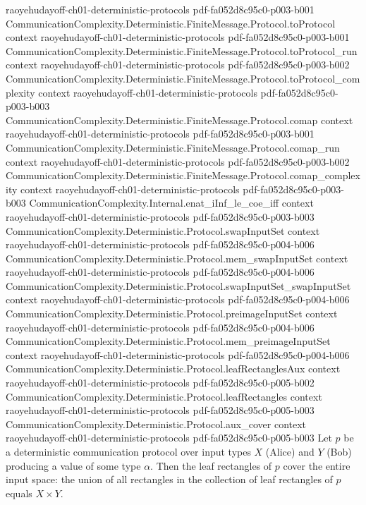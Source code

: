 \begin{lemma}
  {raoyehudayoff-ch01-deterministic-protocols}
  {pdf-fa052d8c95c0-p003-b001}
\proofstep
  {CommunicationComplexity.Deterministic.FiniteMessage.Protocol.toProtocol}
  {context}
  {raoyehudayoff-ch01-deterministic-protocols}
  {pdf-fa052d8c95c0-p003-b001}
\proofstep
  {CommunicationComplexity.Deterministic.FiniteMessage.Protocol.toProtocol_run}
  {context}
  {raoyehudayoff-ch01-deterministic-protocols}
  {pdf-fa052d8c95c0-p003-b002}
\proofstep
  {CommunicationComplexity.Deterministic.FiniteMessage.Protocol.toProtocol_complexity}
  {context}
  {raoyehudayoff-ch01-deterministic-protocols}
  {pdf-fa052d8c95c0-p003-b003}
\proofstep
  {CommunicationComplexity.Deterministic.FiniteMessage.Protocol.comap}
  {context}
  {raoyehudayoff-ch01-deterministic-protocols}
  {pdf-fa052d8c95c0-p003-b001}
\proofstep
  {CommunicationComplexity.Deterministic.FiniteMessage.Protocol.comap_run}
  {context}
  {raoyehudayoff-ch01-deterministic-protocols}
  {pdf-fa052d8c95c0-p003-b002}
\proofstep
  {CommunicationComplexity.Deterministic.FiniteMessage.Protocol.comap_complexity}
  {context}
  {raoyehudayoff-ch01-deterministic-protocols}
  {pdf-fa052d8c95c0-p003-b003}
\proofstep
  {CommunicationComplexity.Internal.enat_iInf_le_coe_iff}
  {context}
  {raoyehudayoff-ch01-deterministic-protocols}
  {pdf-fa052d8c95c0-p003-b003}
\proofstep
  {CommunicationComplexity.Deterministic.Protocol.swapInputSet}
  {context}
  {raoyehudayoff-ch01-deterministic-protocols}
  {pdf-fa052d8c95c0-p004-b006}
\proofstep
  {CommunicationComplexity.Deterministic.Protocol.mem_swapInputSet}
  {context}
  {raoyehudayoff-ch01-deterministic-protocols}
  {pdf-fa052d8c95c0-p004-b006}
\proofstep
  {CommunicationComplexity.Deterministic.Protocol.swapInputSet_swapInputSet}
  {context}
  {raoyehudayoff-ch01-deterministic-protocols}
  {pdf-fa052d8c95c0-p004-b006}
\proofstep
  {CommunicationComplexity.Deterministic.Protocol.preimageInputSet}
  {context}
  {raoyehudayoff-ch01-deterministic-protocols}
  {pdf-fa052d8c95c0-p004-b006}
\proofstep
  {CommunicationComplexity.Deterministic.Protocol.mem_preimageInputSet}
  {context}
  {raoyehudayoff-ch01-deterministic-protocols}
  {pdf-fa052d8c95c0-p004-b006}
\proofstep
  {CommunicationComplexity.Deterministic.Protocol.leafRectanglesAux}
  {context}
  {raoyehudayoff-ch01-deterministic-protocols}
  {pdf-fa052d8c95c0-p005-b002}
\proofstep
  {CommunicationComplexity.Deterministic.Protocol.leafRectangles}
  {context}
  {raoyehudayoff-ch01-deterministic-protocols}
  {pdf-fa052d8c95c0-p005-b003}
\proofstep
  {CommunicationComplexity.Deterministic.Protocol.aux_cover}
  {context}
  {raoyehudayoff-ch01-deterministic-protocols}
  {pdf-fa052d8c95c0-p005-b003}
Let $p$ be a deterministic communication protocol over input types $X$ (Alice) and $Y$
(Bob) producing a value of some type $\alpha$. Then the leaf rectangles of $p$ cover the
entire input space: the union of all rectangles in the collection of leaf rectangles of
$p$ equals $X \times Y$.
\end{lemma}

